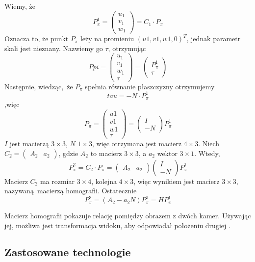 \documentclass[12pt,twoside,polish]{article}
\begin{document}
Wiemy, że
$$P^1_\pi = \begin{pmatrix} u_1 \\ v_1 \\ w_1 \end{pmatrix} = C_1 \cdot P_\pi$$
Oznacza to, że punkt $P_\pi$ leży na promieniu $(u1,v1,w1,0)^T$, jednak parametr skali jest nieznany. Nazwiemy go $\tau$, otrzymując
$$ Ppi = \begin{pmatrix} u_1 \\ v_1 \\ w_1\\ \tau \end{pmatrix} = \begin{pmatrix}P^1_\pi \\ \tau \end{pmatrix}$$
Następnie, wiedząc, że $P_\pi$ spełnia równanie płaszczyzny otrzymujemy
$$ tau = -N \cdot P^1_\pi $$
,więc
$$ P_\pi = \begin{pmatrix} u1 \\ v1 \\ w1 \\ \tau \end{pmatrix} = \begin{pmatrix} I \\-N \end{pmatrix} P^1_\pi $$
$I$ jest macierzą $3 \times 3$, $N$ $1 \times 3$, więc otrzymana jest macierz $4 \times 3$.
Niech $C_2 = \begin{pmatrix} A_2 & a_2\end{pmatrix}$, gdzie $A_2$ to macierz $3\times 3$, a $a_2$ wektor $3 \times 1$. Wtedy,
$$ P^2_\pi = C_2 \cdot P_\pi = \begin{pmatrix} A_2 & a_2\end{pmatrix} \begin{pmatrix}I \\ -N \end{pmatrix} P^1_\pi $$
Macierz $C_2$ ma rozmiar $3 \times 4$, kolejna $4 \times 3$, więc wynikiem jest macierz $3 \times 3$, nazywaną macierzą homografii. Ostatecznie
$$P^2_\pi = (A_2-a_2 N)P^1_\pi = HP^1_\pi$$

Macierz homografii pokazuje relację pomiędzy obrazem z dwóch kamer. Używając jej, możliwa jest transformacja widoku, aby odpowiadał położeniu drugiej \cite[s.660]{learnopencv}.


\subsection{Zastosowane technologie}
\end{document}
